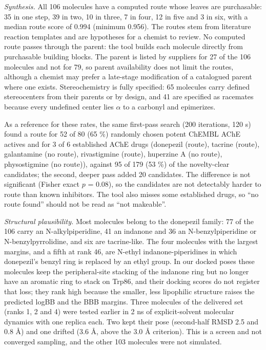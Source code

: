 \documentclass[11pt,a4paper]{article}
\begin{document}
\textit{Synthesis.} All 106 molecules have a computed route whose leaves are purchasable: 35 in one step, 39 in two, 10 in three, 7 in four, 12 in five and 3 in six, with a median route score of 0.994 (minimum 0.956). The routes stem from literature reaction templates and are hypotheses for a chemist to review. No computed route passes through the parent: the tool builds each molecule directly from purchasable building blocks. The parent is listed by suppliers for 27 of the 106 molecules and not for 79, so parent availability does not limit the routes, although a chemist may prefer a late-stage modification of a catalogued parent where one exists. Stereochemistry is fully specified: 65 molecules carry defined stereocenters from their parents or by design, and 41 are specified as racemates because every undefined center lies $\alpha$ to a carbonyl and epimerizes.

As a reference for these rates, the same first-pass search (200 iterations, 120 s) found a route for 52 of 80 (65 \%) randomly chosen potent ChEMBL AChE actives and for 3 of 6 established AChE drugs (donepezil (route), tacrine (route), galantamine (no route), rivastigmine (route), huperzine A (no route), physostigmine (no route)), against 95 of 179 (53 \%) of the novelty-clear candidates; the second, deeper pass added 20 candidates. The difference is not significant (Fisher exact $p$ = 0.08), so the candidates are not detectably harder to route than known inhibitors. The tool also misses some established drugs, so ``no route found'' should not be read as ``not makeable''.

\textit{Structural plausibility.} Most molecules belong to the donepezil family: 77 of the 106 carry an N-alkylpiperidine, 41 an indanone and 36 an N-benzylpiperidine or N-benzylpyrrolidine, and six are tacrine-like. The four molecules with the largest margins, and a fifth at rank 46, are N-ethyl indanone-piperidines in which donepezil's benzyl ring is replaced by an ethyl group. In our docked poses these molecules keep the peripheral-site stacking of the indanone ring but no longer have an aromatic ring to stack on Trp86, and their docking scores do not register that loss; they rank high because the smaller, less lipophilic structure raises the predicted logBB and the BBB margins. Three molecules of the delivered set (ranks 1, 2 and 4) were tested earlier in 2 ns of explicit-solvent molecular dynamics with one replica each. Two kept their pose (second-half RMSD 2.5 and 0.8 \AA{}) and one drifted (3.6 \AA{}, above the 3.0 \AA{} criterion). This is a screen and not converged sampling, and the other 103 molecules were not simulated.
\end{document}
